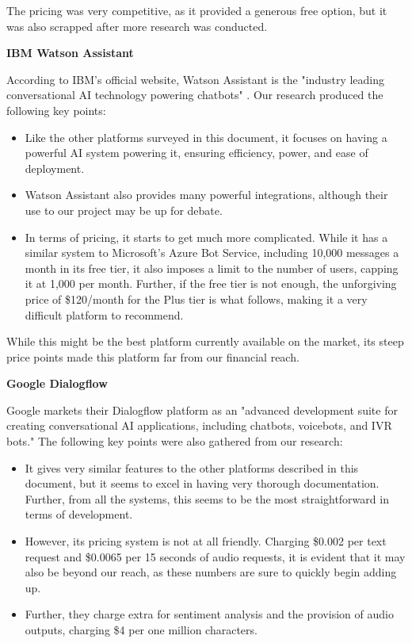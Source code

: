 \documentclass[titlepage, 12pt]{article}
\begin{document}
The pricing was very competitive, as it provided a generous free option, but it was also scrapped after more research was conducted.

\textbf{IBM Watson Assistant}

According to IBM's official website, Watson Assistant is the "industry leading conversational AI technology powering chatbots" \cite{bib-2-17}. Our research produced the following key points:

\begin{itemize}
    \item Like the other platforms surveyed in this document, it focuses on having a powerful AI system powering it, ensuring efficiency, power, and ease of deployment.
    \item Watson Assistant also provides many powerful integrations, although their use to our project may be up for debate.
    \item In terms of pricing, it starts to get much more complicated. While it has a similar system to Microsoft's Azure Bot Service, including 10,000 messages a month in its free tier, it also imposes a limit to the number of users, capping it at 1,000 per month. Further, if the free tier is not enough, the unforgiving price of \$120/month for the Plus tier is what follows, making it a very difficult platform to recommend.
\end{itemize}

While this might be the best platform currently available on the market, its steep price points made this platform far from our financial reach.

\textbf{Google Dialogflow}

Google markets their Dialogflow platform as an "advanced development suite for creating conversational AI applications, including chatbots, voicebots, and IVR bots." The following key points were also gathered from our research:

\begin{itemize}
    \item It gives very similar features to the other platforms described in this document, but it seems to excel in having very thorough documentation. Further, from all the systems, this seems to be the most straightforward in terms of development.
    \item However, its pricing system is not at all friendly. Charging \$0.002 per text request and \$0.0065 per 15 seconds of audio requests, it is evident that it may also be beyond our reach, as these numbers are sure to quickly begin adding up. 
    \item Further, they charge extra for sentiment analysis and the provision of audio outputs, charging \$4 per one million characters.
\end{itemize}
\end{document}
